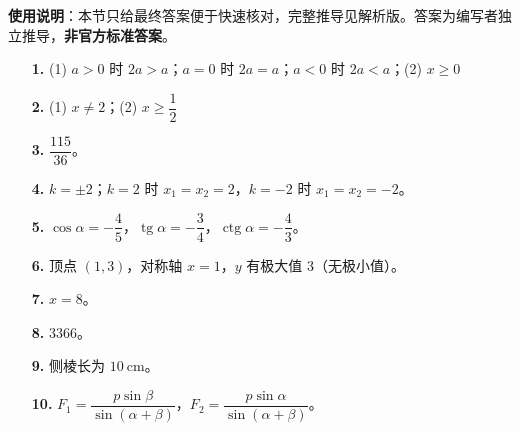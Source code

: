 
\begin{gknotice}
\textbf{使用说明}：本节只给最终答案便于快速核对，完整推导见解析版。答案为编写者独立推导，\textbf{非官方标准答案}。
\end{gknotice}

\begin{itemize}[leftmargin=2.6em]
  \item[\textbf{1.}] (1) $a>0$ 时 $2a>a$；$a=0$ 时 $2a=a$；$a<0$ 时 $2a<a$；(2) $x\ge0$
  \item[\textbf{2.}] (1) $x\ne2$；(2) $x\ge\dfrac{1}{2}$
  \item[\textbf{3.}] $\dfrac{115}{36}$。
  \item[\textbf{4.}] $k=\pm2$；$k=2$ 时 $x_1=x_2=2$，$k=-2$ 时 $x_1=x_2=-2$。
  \item[\textbf{5.}] $\cos\alpha=-\dfrac{4}{5}$，$\operatorname{tg}\alpha=-\dfrac{3}{4}$，$\operatorname{ctg}\alpha=-\dfrac{4}{3}$。
  \item[\textbf{6.}] 顶点 $(1,3)$，对称轴 $x=1$，$y$ 有极大值 $3$（无极小值）。
  \item[\textbf{7.}] $x=8$。
  \item[\textbf{8.}] $3366$。
  \item[\textbf{9.}] 侧棱长为 $10\ \mathrm{cm}$。
  \item[\textbf{10.}] $F_1=\dfrac{p\sin\beta}{\sin(\alpha+\beta)}$，$F_2=\dfrac{p\sin\alpha}{\sin(\alpha+\beta)}$。
\end{itemize}
